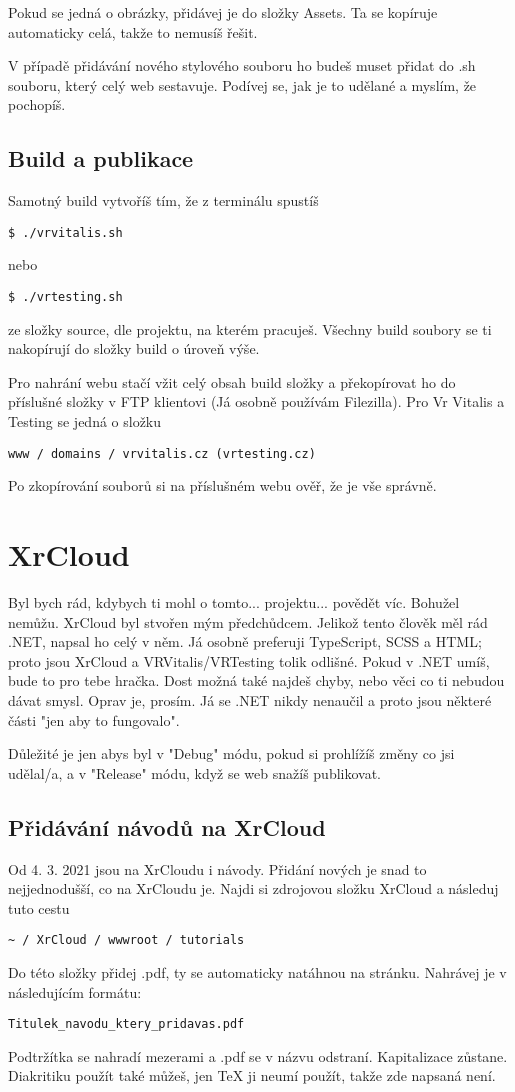 \documentclass{article}
\begin{document}
Pokud se jedná o obrázky, přidávej je do složky Assets. Ta se kopíruje automaticky celá, takže to nemusíš řešit. 

V případě přidávání nového stylového souboru ho budeš muset přidat do .sh souboru, který celý web sestavuje. Podívej se, jak je to udělané a myslím, že pochopíš.

\subsection{Build a publikace}
Samotný build vytvoříš tím, že z terminálu spustíš 
\begin{lstlisting}
$ ./vrvitalis.sh
\end{lstlisting}
nebo 
\begin{lstlisting}
$ ./vrtesting.sh
\end{lstlisting}
ze složky source, dle projektu, na kterém pracuješ. Všechny build soubory se ti nakopírují do složky build o úroveň výše.

Pro nahrání webu stačí vžit celý obsah build složky a překopírovat ho do příslušné složky v FTP klientovi (Já osobně používám Filezilla). Pro Vr Vitalis a Testing se jedná o složku
\begin{lstlisting}
www / domains / vrvitalis.cz (vrtesting.cz)
\end{lstlisting}

Po zkopírování souborů si na příslušném webu ověř, že je vše správně.
\pagebreak

\section{XrCloud}
Byl bych rád, kdybych ti mohl o tomto... projektu... povědět víc. Bohužel nemůžu. XrCloud byl stvořen mým předchůdcem. Jelikož tento člověk měl rád .NET, napsal ho celý v něm. Já osobně preferuji TypeScript, SCSS a HTML; proto jsou XrCloud a VRVitalis/VRTesting tolik odlišné. Pokud v .NET umíš, bude to pro tebe hračka. Dost možná také najdeš chyby, nebo věci co ti nebudou dávat smysl. Oprav je, prosím. Já se .NET nikdy nenaučil a proto jsou některé části "jen aby to fungovalo".

Důležité je jen abys byl v "Debug" módu, pokud si prohlížíš změny co jsi udělal/a, a v "Release" módu, když se web snažíš publikovat.

\subsection{Přidávání návodů na XrCloud}
Od 4. 3. 2021 jsou na XrCloudu i návody. Přidání nových je snad to nejjednodušší, co na XrCloudu je. Najdi si zdrojovou složku XrCloud a následuj tuto cestu
\begin{lstlisting}
~ / XrCloud / wwwroot / tutorials
\end{lstlisting}
Do této složky přidej .pdf, ty se automaticky natáhnou na stránku. Nahrávej je v následujícím formátu:
\begin{lstlisting}
Titulek_navodu_ktery_pridavas.pdf
\end{lstlisting}
Podtržítka se nahradí mezerami a .pdf se v názvu odstraní. Kapitalizace zůstane. Diakritiku použít také můžeš, jen TeX ji neumí použít, takže zde napsaná není.
\pagebreak
\end{document}
